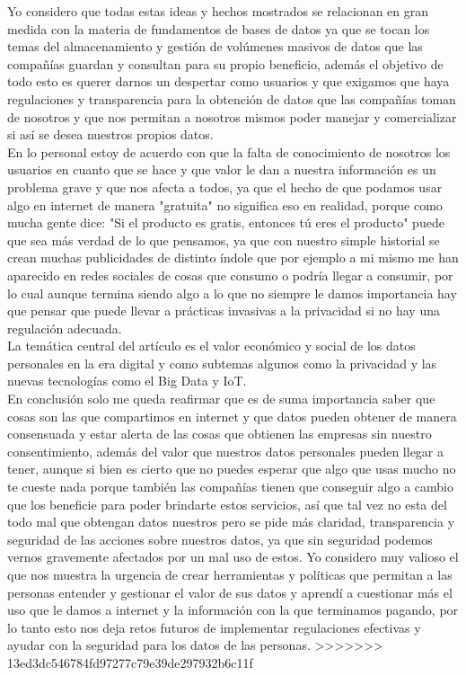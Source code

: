 \documentclass[12pt]{report}
\begin{document}
\begin{enumerate}[label=\textbf{\arabic*.}, leftmargin=*]
\begin{enumerate}[label=\textbf{\alph*.}, leftmargin=*, itemsep=1.0em]
Yo considero que todas estas ideas y hechos mostrados se relacionan en gran medida con la materia de fundamentos de bases de datos ya que se tocan los temas del almacenamiento y gestión de volúmenes masivos de datos que las compañías guardan y consultan para su propio beneficio, además el objetivo de todo esto es querer darnos un despertar como usuarios y que exigamos que haya regulaciones y transparencia para la obtención de datos que las compañías toman de nosotros y que nos permitan a nosotros mismos poder manejar y comercializar si así se desea nuestros propios datos.\\
En lo personal estoy de acuerdo con que la falta de conocimiento de nosotros los usuarios en cuanto que se hace y que valor le dan a nuestra información es un problema grave y que nos afecta a todos, ya que el hecho de que podamos usar algo en internet de manera "gratuita" no significa eso en realidad, porque como mucha gente dice: "Si el producto es gratis, entonces tú eres el producto" puede que sea más verdad de lo que pensamos, ya que con nuestro simple historial se crean muchas publicidades de distinto índole que por ejemplo a mi mismo me han aparecido en redes sociales de cosas que consumo o podría llegar a consumir, por lo cual aunque termina siendo algo a lo que no siempre le damos importancia hay que pensar que puede llevar a prácticas invasivas a la privacidad si no hay una regulación adecuada.\\
La temática central del artículo es el valor económico y social de los datos personales en la era digital y como subtemas algunos como la privacidad y las nuevas tecnologías como el Big Data y IoT.\\

En conclusión solo me queda reafirmar que es de suma importancia saber que cosas son las que compartimos en internet y que datos pueden obtener de manera consensuada y estar alerta de las cosas que obtienen las empresas sin nuestro consentimiento, además del valor que nuestros datos personales pueden llegar a tener, aunque si bien es cierto que no puedes esperar que algo que usas mucho no te cueste nada porque también las compañías tienen que conseguir algo a cambio que los beneficie para poder brindarte estos servicios, así que tal vez no esta del todo mal que obtengan datos nuestros pero se pide más claridad, transparencia y seguridad de las acciones sobre nuestros datos, ya que sin seguridad podemos vernos gravemente afectados por un mal uso de estos. Yo considero muy valioso el que nos muestra la urgencia de crear herramientas y políticas que permitan a las personas entender y gestionar el valor de sus datos y aprendí a cuestionar más el uso que le damos a internet y la información con la que terminamos pagando, por lo tanto esto nos deja retos futuros de implementar regulaciones efectivas y ayudar con la seguridad para los datos de las personas.
>>>>>>> 13ed3dc546784fd97277c79e39de297932b6c11f
\end{enumerate}


\end{enumerate}
\end{document}
